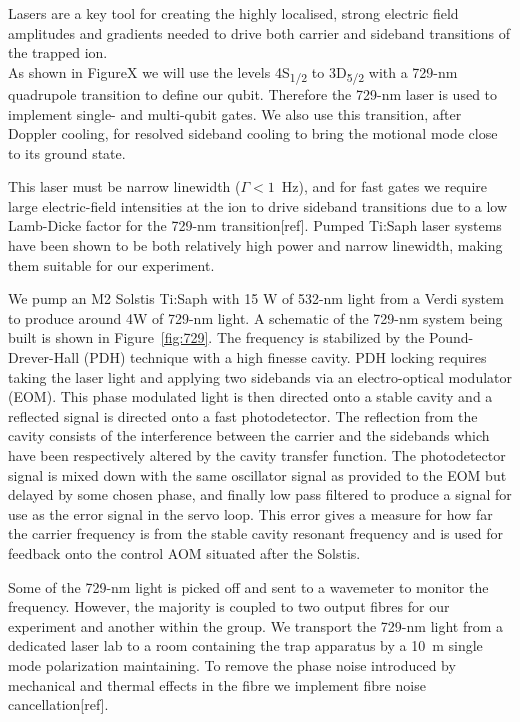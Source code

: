 \documentclass[12pt]{iopart}
\begin{document}
Lasers are a key tool for creating the highly localised, strong
electric field amplitudes and gradients needed to drive both carrier
and sideband transitions of the trapped ion.\\
As shown in FigureX we will use the levels
4S\textsubscript{1/2} to 3D\textsubscript{5/2} with a 729-nm
quadrupole transition to define our qubit. Therefore the 729-nm laser
is used to implement single- and multi-qubit gates. We also use this
transition, after Doppler cooling, for resolved sideband cooling to
bring the motional mode close to its ground state.

This laser must be narrow linewidth ($\Gamma < 1$~Hz), and for fast gates we require
large electric-field intensities at the ion to drive sideband transitions due to a low
Lamb-Dicke factor for the 729-nm transition[ref].
Pumped Ti:Saph laser systems have been shown to be both relatively
high power and narrow linewidth, making them suitable for our
experiment.

We pump an M2 Solstis Ti:Saph with 15 W of 532-nm light from a Verdi
system to produce around 4W of 729-nm light.  A schematic of the
729-nm system being built is shown in Figure~\ref{fig:729}. The
frequency is
stabilized by the Pound-Drever-Hall (PDH) technique with a high
finesse cavity. PDH locking requires taking the laser light and
applying two sidebands via an electro-optical modulator (EOM). This
phase modulated light is then directed onto a stable cavity and a
reflected signal is directed onto a fast photodetector. The reflection
from the cavity consists of the interference between the carrier and
the sidebands which have been respectively altered by the cavity
transfer function. The photodetector signal is mixed down with the
same oscillator signal as provided to the EOM but delayed by some chosen
phase, and finally low pass filtered to produce a signal for use as
the error signal in the servo loop.  This error gives a measure for
how far the carrier frequency is from the stable cavity resonant
frequency and is used for feedback onto the control AOM situated after
the Solstis.

Some of the 729-nm light is picked off and sent to a wavemeter to
monitor the frequency. However, the majority is coupled to two output
fibres for our experiment and another within the group. We transport
the 729-nm light from a dedicated laser lab to a room containing the
trap apparatus by a 10~m single mode polarization maintaining.  To
remove the phase noise introduced by mechanical and thermal effects in
the fibre we implement fibre noise cancellation[ref].
\end{document}
